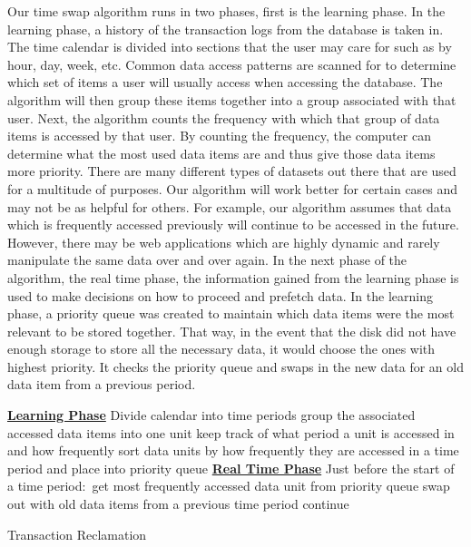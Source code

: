 \documentclass[10pt,final,journal]{IEEEtran}
\begin{document}
  Our time swap algorithm runs in two phases, first is the learning phase. In the learning phase, a history of the transaction logs from the database is taken in. The time calendar is divided into sections that the user may care for such as by hour, day, week, etc. Common data access patterns are scanned for to determine which set of items a user will usually access when accessing the database. The algorithm will then group these items together into a group associated with that user. Next, the algorithm counts the frequency with which that group of data items is accessed by that user. By counting the frequency, the computer can determine what the most used data items are and thus give those data items more priority. There are many different types of datasets out there that are used for a multitude of purposes. Our algorithm will work better for certain cases and may not be as helpful for others. For example, our algorithm assumes that data which is frequently accessed previously will continue to be accessed in the future. However, there may be web applications which are highly dynamic and rarely manipulate the same data over and over again.
	In the next phase of the algorithm, the real time phase, the information gained from the learning phase is used to make decisions on how to proceed and prefetch data. In the learning phase, a priority queue was created to maintain which data items were the most relevant to be stored together. That way, in the event that the disk did not have enough storage to store all the necessary data, it would choose the ones with highest priority. It checks the priority queue and swaps in the new data for an old data item from a previous period.

\begin{algorithm}
\SetAlgoLined
\DontPrintSemicolon
\underline{\textbf{Learning Phase}}\;
Divide calendar into time periods\;
 {
	group the associated accessed data items into one unit\;
	keep track of what period a unit is accessed in and how frequently\;
	sort data units by how frequently they are accessed in a time period and place into priority queue\;
}
\BlankLine
\BlankLine
\underline{\textbf{Real Time Phase}}\;
Just before the start of a time period$:$\;
get most frequently accessed data unit from priority queue\;
 {
	swap out with old data items from a previous time period\;
	}{
	continue
	}

\caption{Transaction Reclamation}
\label{reclaim}
\end{algorithm}
\end{document}
